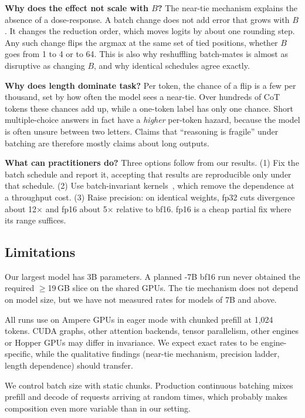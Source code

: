 {\bf Why does the effect not scale with $B$?} The near-tie mechanism explains the absence of a dose-response. A batch change does not add error that grows with $B$. It changes the reduction order, which moves logits by about one rounding step. Any such change flips the argmax at the same set of tied positions, whether $B$ goes from 1 to 4 or to 64. This is also why reshuffling batch-mates is almost as disruptive as changing $B$, and why identical schedules agree exactly.

{\bf Why does length dominate task?} Per token, the chance of a flip is a few per thousand, set by how often the model sees a near-tie. Over hundreds of CoT tokens these chances add up, while a one-token label has only one chance. Short multiple-choice answers in fact have a \emph{higher} per-token hazard, because the model is often unsure between two letters. Claims that ``reasoning is fragile'' under batching are therefore mostly claims about long outputs.

{\bf What can practitioners do?} Three options follow from our results. (1) Fix the batch schedule and report it, accepting that results are reproducible only under that schedule. (2) Use batch-invariant kernels~\citep{he2025nondeterminism}, which remove the dependence at a throughput cost. (3) Raise precision: on identical weights, fp32 cuts divergence about 12$\times$ and fp16 about 5$\times$ relative to bf16. fp16 is a cheap partial fix where its range suffices.

\subsection{Limitations}
\label{sec:limitations}

 Our largest model has 3B parameters. A planned \qwen-7B bf16 run never obtained the required $\ge$19\,GB slice on the shared GPUs. The tie mechanism does not depend on model size, but we have not measured rates for models of 7B and above.

 All runs use  on Ampere GPUs in eager mode with chunked prefill at 1,024 tokens. CUDA graphs, other attention backends, tensor parallelism, other engines or Hopper GPUs may differ in invariance. We expect exact rates to be engine-specific, while the qualitative findings (near-tie mechanism, precision ladder, length dependence) should transfer.

 We control batch size with static chunks. Production continuous batching mixes prefill and decode of requests arriving at random times, which probably makes composition even more variable than in our setting.

